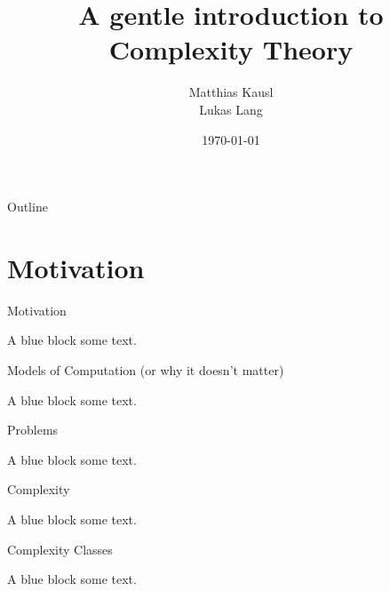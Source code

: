 \documentclass[c]{beamer}
\title{A gentle introduction to Complexity Theory}
\author{Matthias Kausl \\ Lukas Lang}
\institute{Vienna University of Technology}
\date{\today}
\begin{document}
\begin{frame}
\titlepage
\end{frame}

\begin{frame}{Outline}
	\tableofcontents
\end{frame}

\section{Motivation}

\begin{frame}{Motivation}
          
	\begin{block}{A blue block}
		some text.
          \end{block}
\end{frame}

\begin{frame}{Models of Computation (or why it doesn't matter)}
          
	\begin{block}{A blue block}
		some text.
          \end{block}
\end{frame}

\begin{frame}{Problems}
          
	\begin{block}{A blue block}
		some text.
          \end{block}
\end{frame}

\begin{frame}{Complexity}
          
	\begin{block}{A blue block}
		some text.
          \end{block}
\end{frame}

\begin{frame}{Complexity Classes}
          
	\begin{block}{A blue block}
		some text.
          \end{block}
\end{frame}
\end{document}
